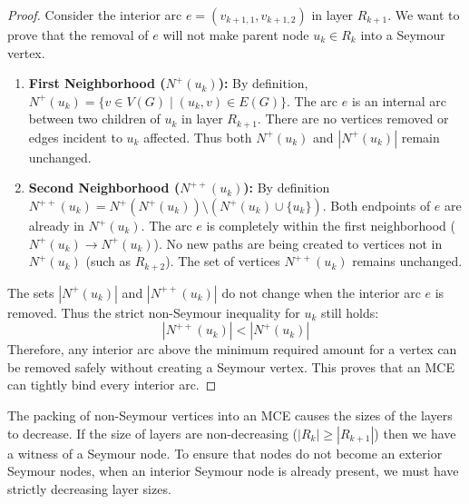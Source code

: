 \documentclass[AMS, Times1COL]{article} %
\theoremstyle{definition}
\begin{document}
	\begin{proof}
		Consider the interior arc $e = (v_{k+1, 1}, v_{k+1, 2})$ in layer $R_{k+1}$. We want to prove that the removal of $e$ will not make parent node $u_k \in R_k$ into a  Seymour vertex.
		
		\begin{enumerate}
			\item \textbf{First Neighborhood ($N^+(u_k)$):} 
			By definition, $N^+(u_k) = \{v \in V(G) \mid (u_k, v) \in E(G)\}$. 
			The arc $e$ is an internal arc between two children of $u_k$ in layer $R_{k+1}$. There are no vertices removed or edges incident to $u_k$ affected. Thus both $N^+(u_k)$ and $|N^+(u_k)|$ remain unchanged.
			
			\item \textbf{Second Neighborhood ($N^{++}(u_k)$):} 
			By definition $N^{++}(u_k) = N^+(N^+(u_k)) \setminus (N^+(u_k) \cup \{u_k\})$. 
			Both endpoints of $e$ are already in $N^+(u_k)$. The arc $e$ is completely within the first neighborhood ($N^+(u_k) \to N^+(u_k)$). No new paths are being created to vertices not in $N^+(u_k)$ (such as $R_{k+2}$). 
			The set of vertices $N^{++}(u_k)$ remains unchanged.
		\end{enumerate}
		
		The sets $|N^+(u_k)|$ and $|N^{++}(u_k)|$ do not change when the interior arc $e$ is removed. Thus the strict non-Seymour inequality for $u_k$ still holds:
		$$ |N^{++}(u_k)| < |N^+(u_k)| $$
		Therefore, any interior arc above the minimum required amount for a vertex can be removed safely without creating a Seymour vertex. 
		This proves that an MCE can tightly bind every interior arc.
	\end{proof}
	
	The packing of non-Seymour vertices into an MCE causes the sizes of the layers to decrease. If the size of layers are non-decreasing ($|R_k| \ge |R_{k+1}|$) then we have a witness of a Seymour node. To ensure that nodes do not become an exterior Seymour nodes, when an interior Seymour node is already present, we must have strictly decreasing layer sizes.	
	
\end{document}

